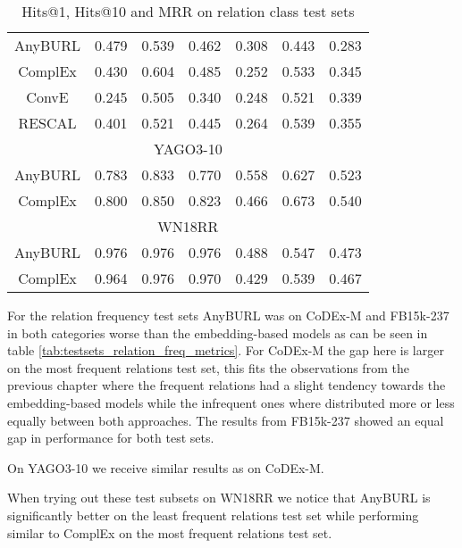 \begin{table}[H]
\begin{tabular}{crrrrrr|}
\multicolumn{1}{c|}{AnyBURL} & 0.479 & 0.539 & \multicolumn{1}{r|}{0.462} & 0.308 & 0.443 & 0.283 \\
\multicolumn{1}{c|}{ComplEx} & 0.430 & 0.604 & \multicolumn{1}{r|}{0.485} & 0.252 & 0.533 & 0.345 \\
\multicolumn{1}{c|}{ConvE} & 0.245 & 0.505 & \multicolumn{1}{r|}{0.340} & 0.248 & 0.521 & 0.339 \\
\multicolumn{1}{c|}{RESCAL} & 0.401 & 0.521 & \multicolumn{1}{r|}{0.445} & 0.264 & 0.539 & 0.355 \\ \hline
\multicolumn{7}{|c|}{YAGO3-10} \\ \hline
\multicolumn{1}{c|}{AnyBURL} & 0.783 & 0.833 & \multicolumn{1}{r|}{0.770} & 0.558 & 0.627 & 0.523 \\
\multicolumn{1}{c|}{ComplEx} & 0.800 & 0.850 & \multicolumn{1}{r|}{0.823} & 0.466 & 0.673 & 0.540 \\ \hline
\multicolumn{7}{|c|}{WN18RR} \\ \hline
\multicolumn{1}{c|}{AnyBURL} & 0.976 & 0.976 & \multicolumn{1}{r|}{0.976} & 0.488 & 0.547 & 0.473 \\
\multicolumn{1}{c|}{ComplEx} & 0.964 & 0.976 & \multicolumn{1}{r|}{0.970} & 0.429 & 0.539 & 0.467
\end{tabular}
\caption{Hits@1, Hits@10 and MRR on relation class test sets}
\label{tab:testsets_relation_class_metrics}
\end{table}

For the relation frequency test sets AnyBURL was on CoDEx-M and FB15k-237 in both categories worse than the embedding-based models as can be seen in table \ref{tab:testsets_relation_freq_metrics}. For CoDEx-M the gap here is larger on the most frequent relations test set, this fits the observations from the previous chapter where the frequent relations had a slight tendency towards the embedding-based models while the infrequent ones where distributed more or less equally between both approaches. The results from FB15k-237 showed an equal gap in performance for both test sets.

On YAGO3-10 we receive similar results as on CoDEx-M.

When trying out these test subsets on WN18RR we notice that AnyBURL is significantly better on the least frequent relations test set while performing similar to ComplEx on the most frequent relations test set.

